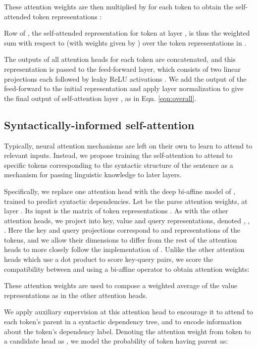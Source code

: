 \documentclass[11pt,a4paper]{article}
\begin{document}
These attention weights are then multiplied by  for each token to obtain the self-attended token representations :

Row  of , the self-attended representation for token  at layer , is thus the weighted sum with respect to  (with weights given by ) over the token representations in . 

The outputs of all attention heads for each token are concatenated, and this representation is passed to the feed-forward layer, which consists of two linear projections each followed by leaky ReLU activations \citep{maas2012rectifier}. We add the output of the feed-forward to the initial representation and apply layer normalization to give the final output of self-attention layer , as in Eqn. \ref{eqn:overall}.

\subsection{Syntactically-informed self-attention \label{sec:syntax-attn}}
Typically, neural attention mechanisms are left on their own to learn to attend to relevant inputs. Instead, we propose training the self-attention to attend to specific tokens corresponding to the syntactic structure of the sentence as a mechanism for passing linguistic knowledge to later layers. 

Specifically, we replace one attention head with the deep bi-affine model of \citet{dozat2017deep}, trained to predict syntactic dependencies. Let  be the parse attention weights, at layer . Its input is the matrix of token representations . As with the other attention heads, we project  into key, value and query representations, denoted , , . Here the key and query projections correspond to  and  representations of the tokens, and we allow their dimensions to differ from the rest of the attention heads to more closely follow the implementation of \citet{dozat2017deep}. Unlike the other attention heads which use a dot product to score key-query pairs, we score the compatibility between  and  using a bi-affine operator  to obtain attention weights:

These attention weights are used to compose a weighted average of the value representations  as in the other attention heads.

We apply auxiliary supervision at this attention head to encourage it to attend to each token's parent in a syntactic dependency tree, and to encode information about the token's dependency label. Denoting the attention weight from token  to a candidate head  as , we model the probability of token  having parent  as:
\end{document}
